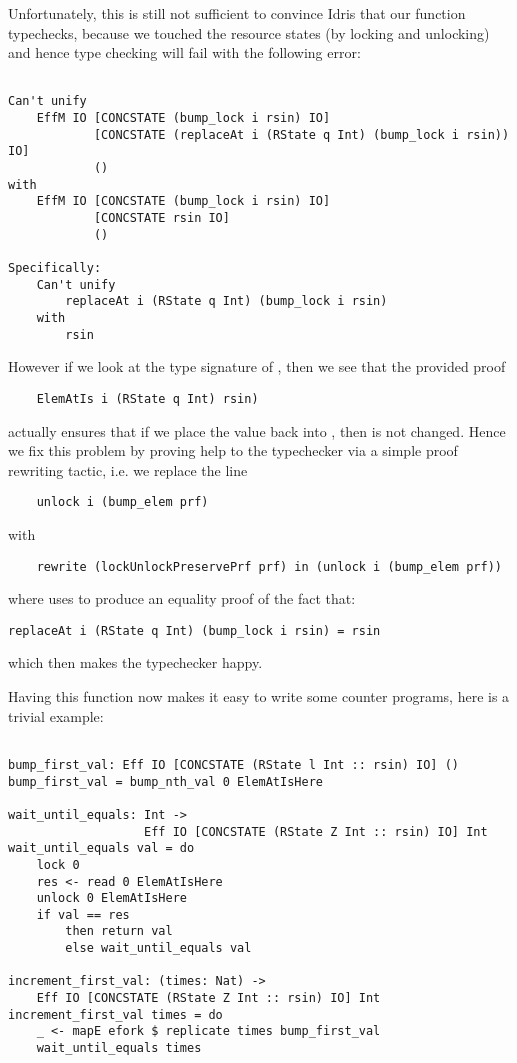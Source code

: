 Unfortunately, this is still not sufficient to convince Idris that our
function typechecks, because we touched the resource states (by locking and
unlocking) and hence type checking will fail with the following error:

\begin{BVerbatim}

Can't unify
    EffM IO [CONCSTATE (bump_lock i rsin) IO]
            [CONCSTATE (replaceAt i (RState q Int) (bump_lock i rsin)) IO]
            ()
with
    EffM IO [CONCSTATE (bump_lock i rsin) IO]
            [CONCSTATE rsin IO]
            ()

Specifically:
    Can't unify
        replaceAt i (RState q Int) (bump_lock i rsin)
    with
        rsin

\end{BVerbatim}


However if we look at the type signature of , then we
see that the provided proof
\begin{Verbatim}
    ElemAtIs i (RState q Int) rsin)
\end{Verbatim}
actually ensures that if we place the value  back into
, then  is not changed. Hence we fix this problem
by proving help to the typechecker via a simple proof rewriting tactic, i.e.
we replace the line
\begin{Verbatim}
    unlock i (bump_elem prf)
\end{Verbatim}
with
\begin{Verbatim}
    rewrite (lockUnlockPreservePrf prf) in (unlock i (bump_elem prf))
\end{Verbatim}
where  uses  to produce an equality proof
of the fact that:
\begin{Verbatim}
replaceAt i (RState q Int) (bump_lock i rsin) = rsin
\end{Verbatim}

which then makes the typechecker happy.

Having this function now makes it easy to write some counter programs, here is
a trivial example:

\begin{BVerbatim}

bump_first_val: Eff IO [CONCSTATE (RState l Int :: rsin) IO] ()
bump_first_val = bump_nth_val 0 ElemAtIsHere

wait_until_equals: Int ->
                   Eff IO [CONCSTATE (RState Z Int :: rsin) IO] Int
wait_until_equals val = do
    lock 0
    res <- read 0 ElemAtIsHere
    unlock 0 ElemAtIsHere
    if val == res
        then return val
        else wait_until_equals val

increment_first_val: (times: Nat) ->
    Eff IO [CONCSTATE (RState Z Int :: rsin) IO] Int
increment_first_val times = do
    _ <- mapE efork $ replicate times bump_first_val
    wait_until_equals times

\end{BVerbatim}


